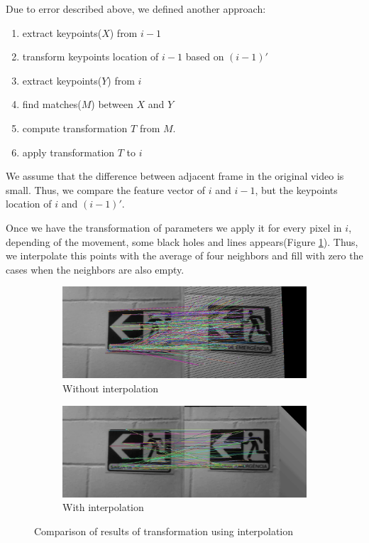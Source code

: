 Due to error described above, we defined another approach:   
\begin{enumerate}
	\item extract keypoints($X$) from $i-1$
	\item transform keypoints location of $i-1$ based on $(i-1)'$
	\item extract keypoints($Y$) from $i$
	\item find matches($M$) between $X$ and $Y$
	\item compute transformation $T$ from $M$.
	\item apply transformation $T$ to $i$
\end{enumerate}

We assume that the difference between adjacent frame in the original video is small. Thus, we compare the feature vector of $i$ and $i-1$, but the keypoints location of $i$ and $(i-1)'$.

Once we have the transformation of parameters we apply it for every pixel in $i$, depending of the movement, some black holes and lines appears(Figure \ref{fig:diff-interpolation}). Thus, we interpolate this points with the average of four neighbors and fill with zero the cases when the neighbors are also empty.

\begin{figure}[!h]
	\centering
	\begin{subfigure}{0.5\textwidth}
	  \centering
	  \includegraphics[width=0.9\linewidth]{figs/without-interpolation.jpg}
	  \caption{Without interpolation}
	\end{subfigure}%
	\begin{subfigure}{0.5\textwidth}
	  \centering
	  \includegraphics[width=0.9\linewidth]{figs/with-interpolation.jpg}
	  \caption{With interpolation}
	\end{subfigure}%
	 \caption{Comparison of results of transformation using interpolation}
	\label{fig:diff-interpolation}
\end{figure}

